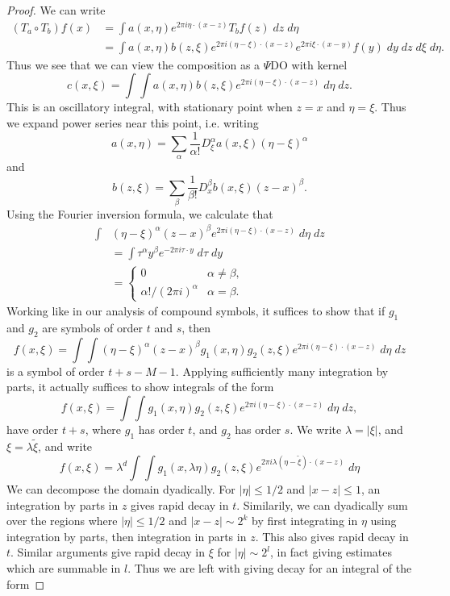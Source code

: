 \begin{proof}
    We can write
    \begin{align*}
        (T_a \circ T_b) f(x) &= \int a(x,\eta) e^{2 \pi i \eta \cdot (x - z)} T_b f(z)\; dz\; d\eta\\
        &= \int a(x,\eta) b(z,\xi) e^{2 \pi i (\eta - \xi) \cdot (x - z)} e^{2 \pi i \xi \cdot (x - y)} f(y)\; dy\; dz\; d\xi\; d\eta.
    \end{align*}
    Thus we see that we can view the composition as a $\Psi$DO with kernel
    \[ c(x,\xi) = \int \int a(x,\eta) b(z,\xi) e^{2 \pi i (\eta - \xi) \cdot (x - z)}\; d\eta\; dz. \]
    This is an oscillatory integral, with stationary point when $z = x$ and $\eta = \xi$. Thus we expand power series near this point, i.e. writing
    \[ a(x,\eta) = \sum_\alpha \frac{1}{\alpha!} D^\alpha_\xi a(x,\xi) (\eta - \xi)^\alpha \]
    and
    \[ b(z,\xi) = \sum_\beta \frac{1}{\beta!} D^\beta_x b(x,\xi) (z - x)^\beta. \]
    Using the Fourier inversion formula, we calculate that
    \begin{align*}
        \int &(\eta - \xi)^\alpha (z - x)^\beta e^{2 \pi i (\eta - \xi) \cdot (x - z)}\; d\eta\; dz\\
        &= \int \tau^\alpha y^\beta e^{-2 \pi i \tau \cdot y}\; d\tau\; dy\\
        &= \begin{cases} 0 & \alpha \neq \beta, \\ \alpha! / (2 \pi i)^\alpha & \alpha = \beta. \end{cases}
    \end{align*}
    Working like in our analysis of compound symbols, it suffices to show that if $g_1$ and $g_2$ are symbols of order $t$ and $s$, then
    \[ f(x,\xi) = \int \int (\eta - \xi)^\alpha (z - x)^\beta g_1(x,\eta) g_2(z,\xi) e^{2 \pi i (\eta - \xi) \cdot (x - z)}\; d\eta\; dz \]
    is a symbol of order $t + s - M - 1$. Applying sufficiently many integration by parts, it actually suffices to show integrals of the form
    \[ f(x,\xi) = \int \int g_1(x,\eta) g_2(z,\xi) e^{2 \pi i (\eta - \xi) \cdot (x - z)}\; d\eta\; dz, \]
    have order $t + s$, where $g_1$ has order $t$, and $g_2$ has order $s$. We write $\lambda = |\xi|$, and $\xi = \lambda \tilde{\xi}$, and write
    \[ f(x,\xi) = \lambda^d \int \int g_1(x, \lambda \eta) g_2(z, \xi) e^{2 \pi i \lambda (\eta - \tilde{\xi}) \cdot (x - z)}\; d\eta \]
    We can decompose the domain dyadically. For $|\eta| \leq 1/2$ and $|x - z| \leq 1$, an integration by parts in $z$ gives rapid decay in $t$. Similarily, we can dyadically sum over the regions where $|\eta| \leq 1/2$ and $|x - z| \sim 2^k$ by first integrating in $\eta$ using integration by parts, then integration in parts in $z$. This also gives rapid decay in $t$. Similar arguments give rapid decay in $\xi$ for $|\eta| \sim 2^l$, in fact giving estimates which are summable in $l$. Thus we are left with giving decay for an integral of the form

\end{proof}
